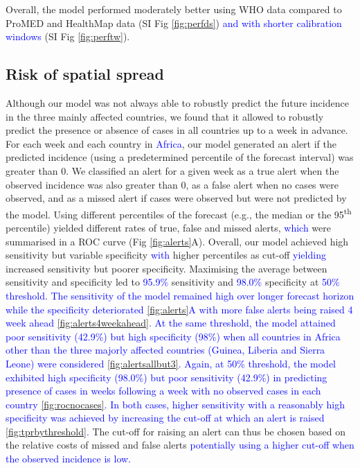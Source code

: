 \documentclass[9pt,twocolumn,twoside,lineno]{pnas-new}
\newcommand{\sangeeta}[1]{\textcolor{blue}{#1}}
\begin{document}
Overall, the model performed moderately better using WHO data compared
to ProMED and HealthMap data (SI Fig \ref{fig:perfds}) \sangeeta{and with shorter 
calibration windows} (SI Fig \ref{fig:perftw}).

\subsection*{Risk of spatial spread}
Although our model was not always able to robustly predict the future
incidence in the three mainly affected countries, we found that it
allowed to robustly predict the
presence or absence of cases in all countries up to a week in
advance. For each week and each country in \sangeeta{Africa}, our model
generated an alert if the predicted incidence (using a predetermined
percentile of the forecast interval) was greater than 0. We classified
an alert for a given week as a true
alert when the observed incidence was also greater than 0, as a false
alert when no cases were observed, and as a missed alert if cases were
observed but were not predicted by the model. Using different
percentiles of the forecast (e.g., the median or the
95\textsuperscript{th} percentile)
yielded different rates of true, false and missed alerts, \sangeeta{which} were
summarised in a ROC curve (Fig \ref{fig:alerts}A). Overall, our model 
achieved high sensitivity but variable specificity \sangeeta{with} higher
percentiles as cut-off \sangeeta{yielding} increased sensitivity but poorer
specificity. Maximising the average between
sensitivity and specificity led to \sangeeta{95.9\%} sensitivity and 
\sangeeta{98.0\%} specificity at \sangeeta{50\% threshold}. \sangeeta{The
sensitivity of the model remained high over longer forecast horizon 
while the specificity deteriorated \ref{fig:alerts}A with more false alerts being raised
4 week ahead \ref{fig:alerts4weekahead}. At the same
threshold, the model attained poor sensitivity (42.9\%) but high
specificity (98\%) when all countries in Africa other than
the three majorly affected countries (Guinea, Liberia and Sierra
Leone) were considered \ref{fig:alertsallbut3}. 
Again, at 50\% threshold, the model exhibited 
high specificity (98.0\%) but poor sensitivity (42.9\%) in predicting 
presence of cases in weeks following a week with no observed cases in each
country \ref{fig:rocnocases}. In both cases, higher sensitivity with a reasonably high
specificity was achieved by increasing the cut-off at which an alert
is raised \ref{fig:tprbythreshold}.} The cut-off for raising an alert 
can thus be chosen based
on the relative costs of missed and false alerts \sangeeta{potentially
using a higher cut-off when the observed incidence is low.}
\end{document}
